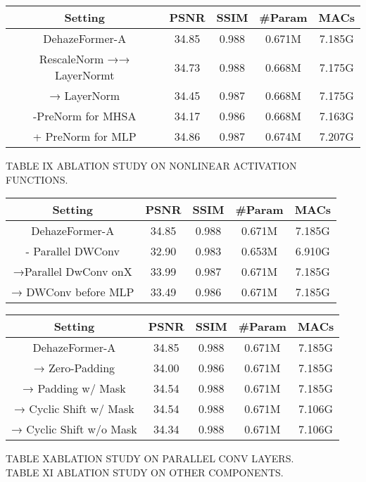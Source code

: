 \documentclass{article}
\begin{document}
\begin{tabular}{|c|c|c|c|c|}\hline
Setting & PSNR & SSIM & #Param & MACs \\ \hline
DehazeFormer-A & 34.85 & 0.988 & 0.671M & 7.185G \\ \hline
RescaleNorm →→ LayerNormt & 34.73 & 0.988 & 0.668M & 7.175G \\ \hline
→ LayerNorm & 34.45 & 0.987 & 0.668M & 7.175G \\ \hline
-PreNorm for MHSA & 34.17 & 0.986 & 0.668M & 7.163G \\ \hline
+ PreNorm for MLP & 34.86 & 0.987 & 0.674M & 7.207G \\ \hline
\end{tabular}
TABLE IX ABLATION STUDY ON NONLINEAR ACTIVATION FUNCTIONS.


\begin{tabular}{|c|c|c|c|c|}\hline
Setting & PSNR & SSIM & #Param & MACs \\ \hline
DehazeFormer-A & 34.85 & 0.988 & 0.671M & 7.185G \\ \hline
- Parallel DWConv & 32.90 & 0.983 & 0.653M & 6.910G \\ \hline
→Parallel DwConv onX & 33.99 & 0.987 & 0.671M & 7.185G \\ \hline
→ DWConv before MLP & 33.49 & 0.986 & 0.671M & 7.185G \\ \hline
\end{tabular}
\begin{tabular}{|c|c|c|c|c|}\hline
Setting & PSNR & SSIM & #Param & MACs \\ \hline
DehazeFormer-A & 34.85 & 0.988 & 0.671M & 7.185G \\ \hline
→ Zero-Padding & 34.00 & 0.986 & 0.671M & 7.185G \\ \hline
→ Padding w/ Mask & 34.54 & 0.988 & 0.671M & 7.185G \\ \hline
→ Cyclic Shift w/ Mask & 34.54 & 0.988 & 0.671M & 7.106G \\ \hline
→ Cyclic Shift w/o Mask & 34.34 & 0.988 & 0.671M & 7.106G \\ \hline
\end{tabular}
TABLE XABLATION STUDY ON PARALLEL CONV LAYERS.\\
TABLE XI ABLATION STUDY ON OTHER COMPONENTS.
\end{document}
